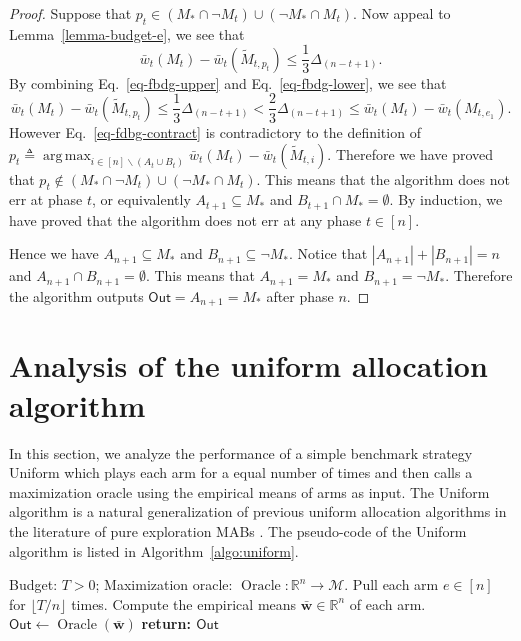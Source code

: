 \documentclass{article}
\newcommand{\Uniform}{{\small \textsf{Uniform}}\xspace}
\newcommand{\M}{\mathcal M}
\newcommand{\del}{\backslash}
\newcommand{\RR}{\mathbb R}
\DeclareMathOperator*{\argmax}{arg\,max}
\DeclareMathOperator{\Oracle}{Oracle}
\newcommand{\out}{\mathsf{Out}}
\renewcommand{\vec}[1]{\boldsymbol{#1}}
\begin{document}
\begin{proof}
Suppose that $p_t \in (M_* \cap \neg M_t) \cup (\neg M_* \cap M_t)$.
Now appeal to Lemma~\ref{lemma-budget-e}, we see that
\begin{equation}
\label{eq-fbdg-lower}
\bar w_t(M_t) - \bar w_t(\tilde M_{t,p_t}) \le \frac{1}{3} \Delta_{(n-t+1)}.
\end{equation}
By combining Eq.~\eqref{eq-fbdg-upper} and Eq.~\eqref{eq-fbdg-lower}, we see that
\begin{equation}
\bar w_t(M_t) - \bar w_t(\tilde M_{t,p_t}) \le \frac{1}{3} \Delta_{(n-t+1)} < \frac{2}3 \Delta_{(n-t+1)} \le \bar w_t(M_t)- \bar w_t(M_{t,e_1}).
\label{eq-fdbg-contract}
\end{equation}
However Eq.~\eqref{eq-fdbg-contract} is contradictory to the definition of $p_t \triangleq \argmax_{i\in [n]\del (A_t\cup B_t)} \bar w_t(M_t)- \bar w_t(\tilde M_{t,i})$.
Therefore we have proved that $p_t \not\in (M_* \cap \neg M_t) \cup (\neg M_* \cap M_t)$.
This means that the algorithm does not err at phase $t$, or equivalently $A_{t+1} \subseteq M_*$ and $B_{t+1}\cap M_* = \emptyset$.
By induction, we have proved that the algorithm does not err at any phase $t\in[n]$.

Hence we have $A_{n+1} \subseteq M_*$ and $B_{n+1}\subseteq  \neg M_*$.
Notice that $|A_{n+1}| + |B_{n+1}| = n$ and $A_{n+1}\cap B_{n+1}=\emptyset$. This means that $A_{n+1} = M_*$ and $B_{n+1} = \neg M_*$.
Therefore the algorithm outputs $\out=A_{n+1}=M_*$ after phase $n$.
\end{proof}


\section{Analysis of the uniform allocation algorithm}
In this section, we analyze the performance of a simple benchmark strategy \Uniform which plays each arm for a equal number of times and then calls a maximization oracle using the empirical means of arms as input.
The \Uniform algorithm is a natural generalization of previous uniform allocation algorithms in the literature of pure exploration MABs \citep{bubeck2010pure}.
The pseudo-code of the \Uniform algorithm is listed in Algorithm~\ref{algo:uniform}.

\begin{algorithm}[htbp]
{
\small
\begin{algorithmic}[1]
\Require Budget: $T>0$; Maximization oracle: $\Oracle: \RR^n \rightarrow \M$.
\State Pull each arm $e\in [n]$ for $\lfloor T/n\rfloor$ times.
\State Compute the empirical means $\vec {\bar w} \in \RR^n$ of each arm.
\State $\out \gets \Oracle(\vec {\bar w})$
\State \textbf{return: $\out$} 
\end{algorithmic}
\caption{\Uniform: Uniform Allocation}
\label{algo:uniform}
}
\end{algorithm}
\end{document}
